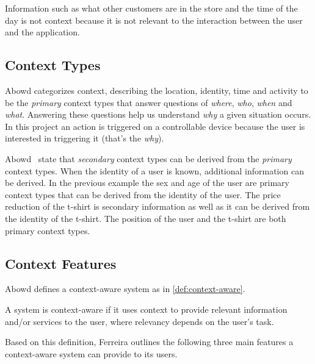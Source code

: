 Information such as what other customers are in the store and the time of the day is not context because it is not relevant to the interaction between the user and the application.

\subsection{Context Types}

Abowd \etal\cite{abowd1999towards} categorizes context, describing the location, identity, time and activity to be the \emph{primary} context types that answer questions of \emph{where}, \emph{who}, \emph{when} and \emph{what}. Answering these questions help us understand \emph{why} a given situation occurs. In this project an action is triggered on a controllable device because the user is interested in triggering it (that's the \emph{why}).

Abowd \etal~state that \emph{secondary} context types can be derived from the \emph{primary} context types. When the identity of a user is known, additional information can be derived. In the previous example the sex and age of the user are primary context types that can be derived from the identity of the user. 
The price reduction of the t-shirt is secondary information as well as it can be derived from the identity of the t-shirt.
The position of the user and the t-shirt are both primary context types.

\subsection{Context Features}

Abowd \etal\cite{abowd1999towards} defines a context-aware system as in \cref{def:context-aware}.

\begin{definition}
\label{def:context-aware}
A system is context-aware if it uses context to provide relevant information and/or services to the user, where relevancy depends on the user's task.
\end{definition}

Based on this definition, Ferreira \etal\cite{ferreira2014distributed} outlines the following three main features a context-aware system can provide to its users.

